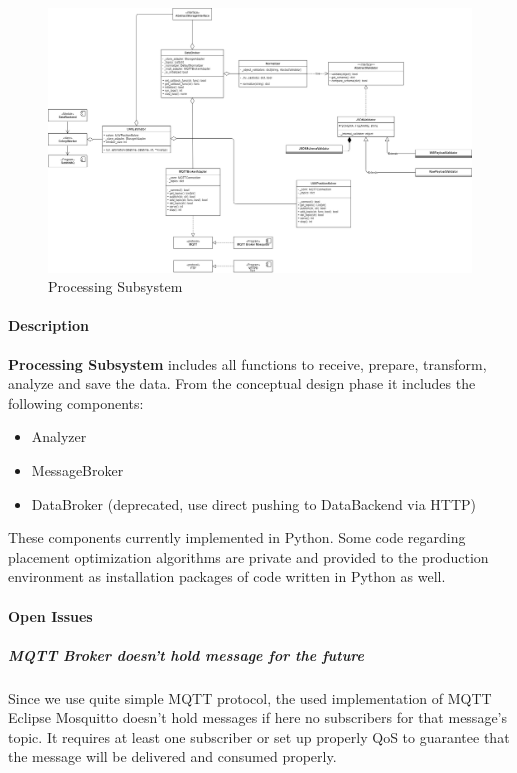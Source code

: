 \begin{figure}[!h]
	\centering
	\includegraphics[width=\linewidth]{schemes/classes/ClassDiagram-processing_subsystem.png}
\caption{Processing Subsystem}
\end{figure}

\paragraph{Description}\label{description}

\textbf{Processing Subsystem} includes all functions to receive,
prepare, transform, analyze and save the data. From the conceptual
design phase it includes the following components:

\begin{itemize}
\item
  Analyzer
\item
  MessageBroker
\item
  DataBroker (deprecated, use direct pushing to DataBackend via HTTP)
\end{itemize}

These components currently implemented in Python. Some code regarding
placement optimization algorithms are private and provided to the
production environment as installation packages of code written in
Python as well.

\paragraph{Open Issues}\label{open-issues}

\subparagraph{MQTT Broker doesn't hold message for the
future}\label{mqtt-broker-doesnt-hold-message-for-the-future}

Since we use quite simple MQTT protocol, the used implementation of MQTT
Eclipse Mosquitto doesn't hold messages if here no subscribers for that
message's topic. It requires at least one subscriber or set up properly
QoS to guarantee that the message will be delivered and consumed
properly.

